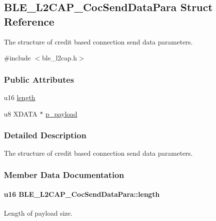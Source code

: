 \hypertarget{struct_b_l_e___l2_c_a_p___coc_send_data_para}{}\subsection{B\+L\+E\+\_\+\+L2\+C\+A\+P\+\_\+\+Coc\+Send\+Data\+Para Struct Reference}
\label{struct_b_l_e___l2_c_a_p___coc_send_data_para}


The structure of credit based connection send data parameters.  




{\ttfamily \#include $<$ble\+\_\+l2cap.\+h$>$}

\subsubsection*{Public Attributes}
\begin{DoxyCompactItemize}
\item 
u16 \hyperlink{struct_b_l_e___l2_c_a_p___coc_send_data_para_ab54abfb34200263164e7595c7f7418bd}{length}
\item 
u8 X\+D\+A\+TA $\ast$ \hyperlink{struct_b_l_e___l2_c_a_p___coc_send_data_para_a3ce986c79dd4de08605990d2b0c8875e}{p\+\_\+payload}
\end{DoxyCompactItemize}


\subsubsection{Detailed Description}
The structure of credit based connection send data parameters. 

\subsubsection{Member Data Documentation}
\paragraph[{\texorpdfstring{length}{length}}]{\setlength{\rightskip}{0pt plus 5cm}u16 B\+L\+E\+\_\+\+L2\+C\+A\+P\+\_\+\+Coc\+Send\+Data\+Para\+::length}\hypertarget{struct_b_l_e___l2_c_a_p___coc_send_data_para_ab54abfb34200263164e7595c7f7418bd}{}\label{struct_b_l_e___l2_c_a_p___coc_send_data_para_ab54abfb34200263164e7595c7f7418bd}
Length of payload size. 
